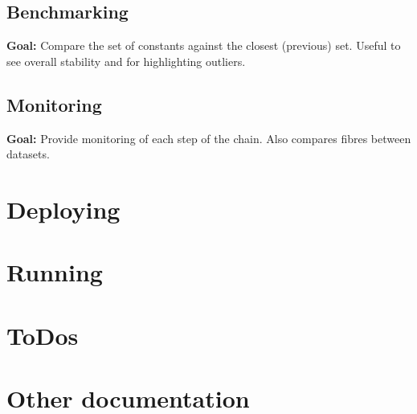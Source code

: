 \documentclass[12pt]{article}
\begin{document}
\subsection{Benchmarking}
\textbf{Goal:} Compare the set of constants against the closest (previous) set. Useful to see overall stability and for highlighting outliers.

\subsection{Monitoring}
\textbf{Goal:} Provide monitoring of each step of the chain. Also compares fibres between datasets.

\section{Deploying}

\section{Running}

\section{ToDos}

\section{Other documentation}
\end{document}
